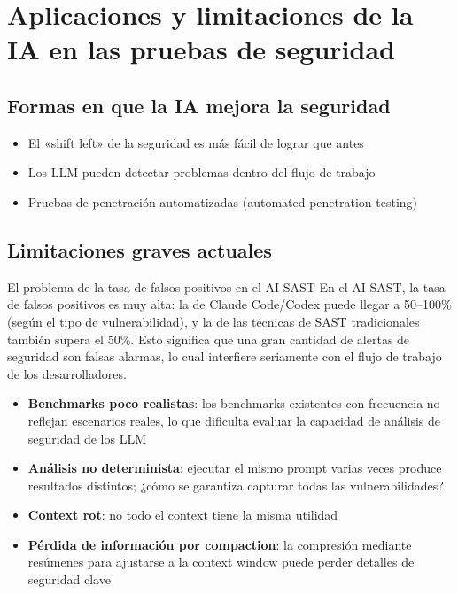\section{Aplicaciones y limitaciones de la IA en las pruebas de seguridad}

\subsection{Formas en que la IA mejora la seguridad}

\begin{itemize}
    \item El «shift left» de la seguridad es más fácil de lograr que antes
    \item Los LLM pueden detectar problemas dentro del flujo de trabajo
    \item Pruebas de penetración automatizadas (automated penetration testing)
\end{itemize}

\subsection{Limitaciones graves actuales}

\begin{warningbox}{El problema de la tasa de falsos positivos en el AI SAST}
En el AI SAST, la tasa de falsos positivos es muy alta: la de Claude Code/Codex puede llegar a 50--100\% (según el tipo de vulnerabilidad), y la de las técnicas de SAST tradicionales también supera el 50\%. Esto significa que una gran cantidad de alertas de seguridad son falsas alarmas, lo cual interfiere seriamente con el flujo de trabajo de los desarrolladores.
\end{warningbox}

\begin{itemize}
    \item \textbf{Benchmarks poco realistas}: los benchmarks existentes con frecuencia no reflejan escenarios reales, lo que dificulta evaluar la capacidad de análisis de seguridad de los LLM
    \item \textbf{Análisis no determinista}: ejecutar el mismo prompt varias veces produce resultados distintos; ¿cómo se garantiza capturar todas las vulnerabilidades?
    \item \textbf{Context rot}: no todo el context tiene la misma utilidad
    \item \textbf{Pérdida de información por compaction}: la compresión mediante resúmenes para ajustarse a la context window puede perder detalles de seguridad clave
\end{itemize}

